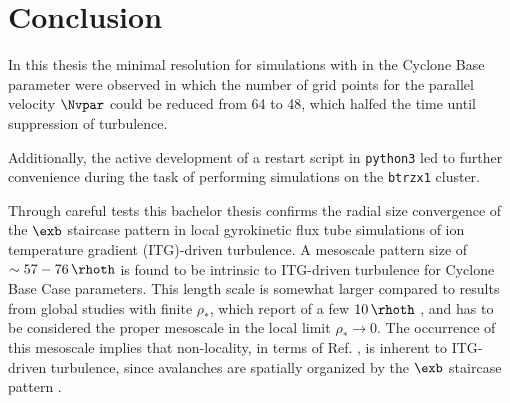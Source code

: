 
\NewPage
\chapter{Conclusion}
\label{chap:close}

\thispagestyle{empty}
\newpage

In this thesis the minimal resolution for simulations with \gkw in the Cyclone Base parameter were observed in which the number of grid points for the parallel velocity $\Nvpar$ could be reduced from 64 to 48, which halfed the time until suppression of turbulence. \bigskip

Additionally, the active development of a restart script in \texttt{python3} led to further convenience during the task of performing simulations on the \texttt{btrzx1} cluster. \bigskip

Through careful tests this bachelor thesis confirms the radial size convergence of the $\exb$ staircase pattern in local gyrokinetic flux tube simulations of ion temperature gradient (ITG)-driven turbulence.
A mesoscale pattern size of $\sim 57 - 76\,\rhoth$ is found to be intrinsic to ITG-driven turbulence for Cyclone Base Case parameters.
This length scale is somewhat larger compared to results from global studies with finite $\rho_\ast$, which report of a few $10\,\rhoth$ \cite{Pradalier2010}, and has to be considered the proper mesoscale in the local limit $\rho_\ast \rightarrow 0$.  
The occurrence of this mesoscale implies that non-locality, in terms of Ref. , is inherent to ITG-driven turbulence, since avalanches are spatially organized by the $\exb$ staircase pattern \cite{McMillan2009, Pradalier2010, Rath2016, Peeters2016}. 